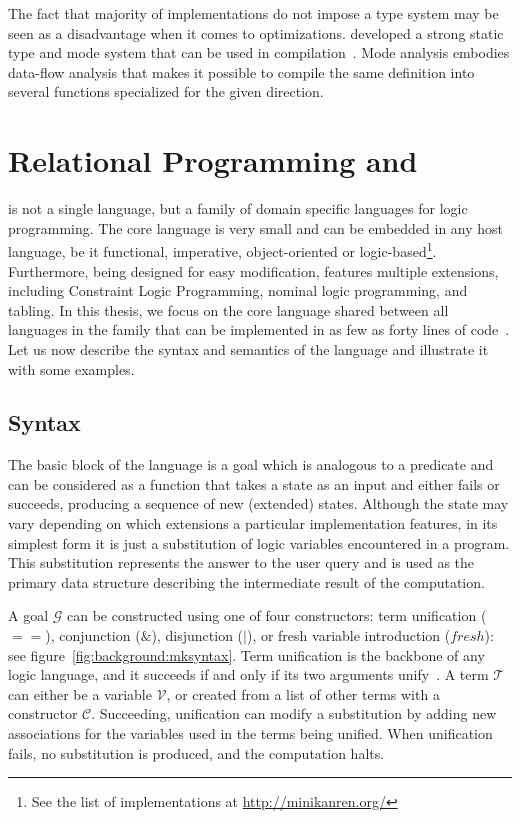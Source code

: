 \documentclass[crop=false]{standalone}
\begin{document}
The fact that majority of \prolog implementations do not impose a type system may be seen as a disadvantage when it comes to optimizations. 
\merc developed a strong static type and mode system that can be used in compilation~\cite{overton2002constraint,overton2003precise}. 
Mode analysis embodies data-flow analysis that makes it possible to compile the same definition into several functions specialized for the given direction. 

\section{Relational Programming and \mk}
 
\mk is not a single language, but a family of domain specific languages for logic programming. 
The core language is very small and can be embedded in any host language, be it functional, imperative, object-oriented or logic-based\footnote{See the list of \mk implementations at \url{http://minikanren.org/}}. 
Furthermore, being designed for easy modification, \mk features multiple extensions, including Constraint Logic Programming, nominal logic programming, and tabling. 
In this thesis, we focus on the core \mk language shared between all languages in the family that can be implemented in as few as forty lines of code~\cite{hemann2013mukanren}. 
Let us now describe the syntax and semantics of the language and illustrate it with some examples. 

\subsection{Syntax}

The basic block of the language is a goal which is analogous to a predicate and can be considered as a function that takes a state as an input and either fails or succeeds, producing a sequence of new (extended) states. 
Although the state may vary depending on which extensions a particular implementation features, in its simplest form it is just a substitution of logic variables encountered in a program. 
This substitution represents the answer to the user query and is used as the primary data structure describing the intermediate result of the computation. 

A goal $\mathcal{G}$ can be constructed using one of four constructors: term unification ($==$), conjunction ($\&$), disjunction ($|$), or fresh variable introduction ($fresh$): see figure~\ref{fig:background:mksyntax}. 
Term unification is the backbone of any logic language, and it succeeds if and only if its two arguments unify~\cite{baader2001unification}. 
A term $\mathcal{T}$ can either be a variable $\mathcal{V}$, or created from a list of other terms with a constructor $\mathcal{C}$. 
Succeeding, unification can modify a substitution by adding new associations for the variables used in the terms being unified. 
When unification fails, no substitution is produced, and the computation halts. 
\end{document}
